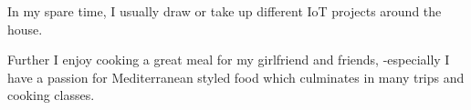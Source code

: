 In my spare time, I usually draw or take up different IoT projects around the house.

Further I enjoy cooking a great meal for my girlfriend and friends, -especially I have a passion for Mediterranean styled food which culminates in many trips and cooking classes.



